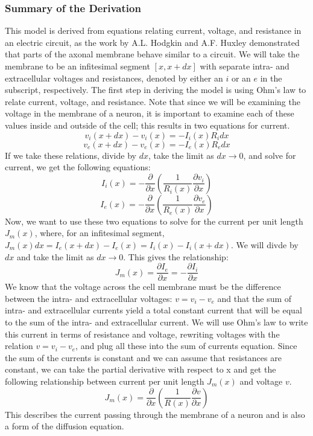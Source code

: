 \documentclass[12pt]{article}
\begin{document}
\subsubsection{Summary of the Derivation}
This model is derived from equations relating current, voltage, and resistance in an electric circuit, as the work by A.L. Hodgkin and A.F. Huxley demonstrated that parts of the axonal membrane behave similar to a circuit. We will take the membrane to be an infitesimal segment $[x, x+dx]$ with separate intra- and extracellular voltages and resistances, denoted by either an $i$ or an $e$ in the subscript, respectively. The first step in deriving the model is using Ohm's law to relate current, voltage, and resistance. Note that since we will be examining the voltage in the membrane of a neuron, it is important to examine each of these values inside and outside of the cell; this results in two equations for current. 
\[v_i(x+dx)-v_i(x)=-I_i(x)R_idx\]
\[v_e(x+dx)-v_e(x)=-I_e(x)R_edx\]
If we take these relations, divide by $dx$,  take the limit as $dx\rightarrow 0$, and solve for current, we get the following equations:
\[I_i(x)=-\frac{\partial}{\partial{x}}(\frac{1}{R_i(x)}\frac{\partial{v_i}}{\partial{x}})\]
\[I_e(x)=-\frac{\partial}{\partial{x}}(\frac{1}{R_e(x)}\frac{\partial{v_e}}{\partial{x}})\]
Now, we want to use these two equations to solve for the current per unit length $J_m(x)$, where, for an infitesimal segment, $J_m(x)dx=I_e(x+dx)-I_e(x)=I_i(x)-I_i(x+dx)$. We will divde by $dx$ and take the limit as $dx\rightarrow 0$. This gives the relationship:
\[J_m(x)=\frac{\partial{I_e}}{\partial{x}}=-\frac{\partial{I_i}}{\partial{x}}\]
We know that the voltage across the cell membrane must be the difference between the intra- and extracellular voltages: $v=v_i-v_e$ and that the sum of intra- and extracellular currents yield a total constant current that will be equal to the sum of the intra- and extracellular current. We will use Ohm's law to write this current in terms of resistance and voltage, rewriting voltages with the relation $v=v_i-v_e$, and plug all these into the sum of currents equation. Since the sum of the currents is constant and we can assume that resistances are constant, we can take the partial derivative with respect to x and get the following relationship between current per unit length $J_m(x)$ and voltage $v$.
\begin{equation} \label{2}
J_m(x)=\frac{\partial}{\partial{x}}(\frac{1}{R(x)}\frac{\partial{v}}{\partial{x}})
\end {equation}
This describes the current passing through the membrane of a neuron and is also a form of the diffusion equation.\par
\end{document}
